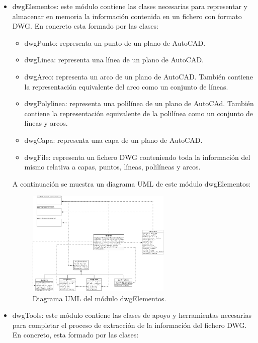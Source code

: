 \begin{itemize}

\item{dwgElementos: este módulo contiene las clases necesarias para representar y almacenar en memoria la información contenida en un fichero con formato DWG. En concreto esta formado por las clases:}

\begin{itemize}

\item{dwgPunto: representa un punto de un plano de AutoCAD.}
\item{dwgLinea: representa una línea de un plano de AutoCAD.}
\item{dwgArco: representa un arco de un plano de AutoCAD. También contiene la representación equivalente del arco como un conjunto de líneas.}
\item{dwgPolylinea: representa una polilínea de un plano de AutoCAd. También contiene la representación equivalente de la polilínea como un conjunto de líneas y arcos.}
\item{dwgCapa: representa una capa de un plano de AutoCAD.}
\item{dwgFile: representa un fichero DWG conteniendo toda la información del mismo relativa a capas, puntos, líneas, polilíneas y arcos.}

\end{itemize}

A continuación se muestra un diagrama UML de este módulo dwgElementos:

\begin{figure}[H]
\begin{center}
\includegraphics[width=0.65\textwidth]{imgs/dwgElementos}
\caption{Diagrama UML del módulo dwgElementos.}
\end{center}
\end{figure}

\item{dwgTools: este módulo contiene las clases de apoyo y herramientas necesarias para completar el proceso de extracción de la información del fichero DWG. En concreto, esta formado por las clases:}


\end{itemize}

